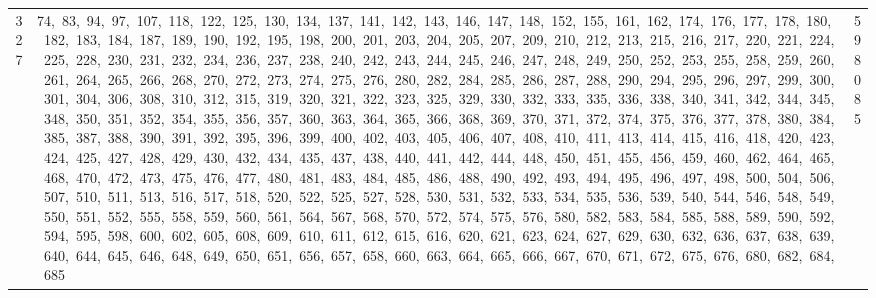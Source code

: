 \begin{longtable}{c|p{}|r}
327 & 74,\ 83,\ 94,\ 97,\ 107,\ 118,\ 122,\ 125,\ 130,\ 134,\ 137,\ 141,\ 142,\ 143,\ 146,\ 147,\ 148,\ 152,\ 155,\ 161,\ 162,\ 174,\ 176,\ 177,\ 178,\ 180,\ 182,\ 183,\ 184,\ 187,\ 189,\ 190,\ 192,\ 195,\ 198,\ 200,\ 201,\ 203,\ 204,\ 205,\ 207,\ 209,\ 210,\ 212,\ 213,\ 215,\ 216,\ 217,\ 220,\ 221,\ 224,\ 225,\ 228,\ 230,\ 231,\ 232,\ 234,\ 236,\ 237,\ 238,\ 240,\ 242,\ 243,\ 244,\ 245,\ 246,\ 247,\ 248,\ 249,\ 250,\ 252,\ 253,\ 255,\ 258,\ 259,\ 260,\ 261,\ 264,\ 265,\ 266,\ 268,\ 270,\ 272,\ 273,\ 274,\ 275,\ 276,\ 280,\ 282,\ 284,\ 285,\ 286,\ 287,\ 288,\ 290,\ 294,\ 295,\ 296,\ 297,\ 299,\ 300,\ 301,\ 304,\ 306,\ 308,\ 310,\ 312,\ 315,\ 319,\ 320,\ 321,\ 322,\ 323,\ 325,\ 329,\ 330,\ 332,\ 333,\ 335,\ 336,\ 338,\ 340,\ 341,\ 342,\ 344,\ 345,\ 348,\ 350,\ 351,\ 352,\ 354,\ 355,\ 356,\ 357,\ 360,\ 363,\ 364,\ 365,\ 366,\ 368,\ 369,\ 370,\ 371,\ 372,\ 374,\ 375,\ 376,\ 377,\ 378,\ 380,\ 384,\ 385,\ 387,\ 388,\ 390,\ 391,\ 392,\ 395,\ 396,\ 399,\ 400,\ 402,\ 403,\ 405,\ 406,\ 407,\ 408,\ 410,\ 411,\ 413,\ 414,\ 415,\ 416,\ 418,\ 420,\ 423,\ 424,\ 425,\ 427,\ 428,\ 429,\ 430,\ 432,\ 434,\ 435,\ 437,\ 438,\ 440,\ 441,\ 442,\ 444,\ 448,\ 450,\ 451,\ 455,\ 456,\ 459,\ 460,\ 462,\ 464,\ 465,\ 468,\ 470,\ 472,\ 473,\ 475,\ 476,\ 477,\ 480,\ 481,\ 483,\ 484,\ 485,\ 486,\ 488,\ 490,\ 492,\ 493,\ 494,\ 495,\ 496,\ 497,\ 498,\ 500,\ 504,\ 506,\ 507,\ 510,\ 511,\ 513,\ 516,\ 517,\ 518,\ 520,\ 522,\ 525,\ 527,\ 528,\ 530,\ 531,\ 532,\ 533,\ 534,\ 535,\ 536,\ 539,\ 540,\ 544,\ 546,\ 548,\ 549,\ 550,\ 551,\ 552,\ 555,\ 558,\ 559,\ 560,\ 561,\ 564,\ 567,\ 568,\ 570,\ 572,\ 574,\ 575,\ 576,\ 580,\ 582,\ 583,\ 584,\ 585,\ 588,\ 589,\ 590,\ 592,\ 594,\ 595,\ 598,\ 600,\ 602,\ 605,\ 608,\ 609,\ 610,\ 611,\ 612,\ 615,\ 616,\ 620,\ 621,\ 623,\ 624,\ 627,\ 629,\ 630,\ 632,\ 636,\ 637,\ 638,\ 639,\ 640,\ 644,\ 645,\ 646,\ 648,\ 649,\ 650,\ 651,\ 656,\ 657,\ 658,\ 660,\ 663,\ 664,\ 665,\ 666,\ 667,\ 670,\ 671,\ 672,\ 675,\ 676,\ 680,\ 682,\ 684,\ 685 & 598085 \\

\end{longtable}
